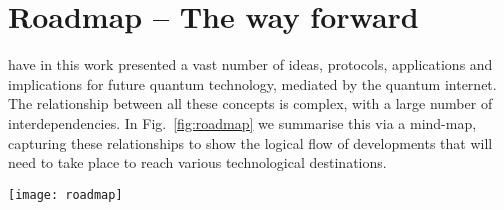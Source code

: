 %
%

\part{Roadmap -- The way forward}

 have in this work presented a vast number of ideas, protocols, applications and implications for future quantum technology, mediated by the quantum internet. The relationship between all these concepts is complex, with a large number of interdependencies. In Fig.~\ref{fig:roadmap} we summarise this via a mind-map, capturing these relationships to show the logical flow of developments that will need to take place to reach various technological destinations.

\begin{figure*}
	\texttt{[image: roadmap]}
	\caption{Relationships and dependencies in the development and deployment of the major concepts in the quantum internet.}\label{fig:roadmap}
\end{figure*}
